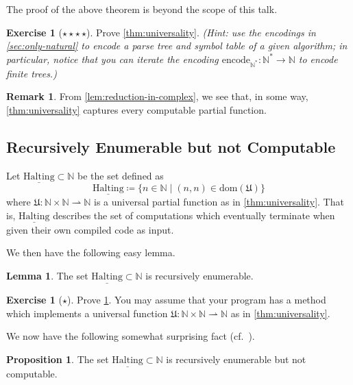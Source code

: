 \documentclass[11pt,a4paper,reqno]{amsart}
\theoremstyle{plain}
\theoremstyle{definition}
\newtheorem{lemma}[theorem]{Lemma}
\newtheorem{proposition}[theorem]{Proposition}
\theoremstyle{definition}
\newtheorem{exercise}[theorem]{Exercise}
\newtheorem{remark}[theorem]{Remark}
\newcommand\exerciseLevelEasy{$\star$}
\newcommand\exerciseLevelVeryHard{$\star${\,}$\star${\,}$\star${\,}$\star$}
\begin{document}
The proof of the above theorem is beyond the scope of this talk.

\begin{exercise}[\exerciseLevelVeryHard]
	Prove \cref{thm:universality}. \textit{(Hint: use the encodings in \cref{sec:only-natural} to encode a parse tree and symbol table of a given algorithm; in particular, notice that you can iterate the encoding $\mathrm{encode}_{\mathbb N^*}\colon \mathbb N^*\to\mathbb N$ to encode finite trees.)}
\end{exercise}

\smallskip

\begin{remark}
	From \cref{lem:reduction-in-complex}, we see that, in some way, \cref{thm:universality} captures every computable partial function.
\end{remark}

\subsection{Recursively Enumerable but not Computable}\label{sec:re-not-comp}

Let $\underline{\mathrm{Halting}}\subset \mathbb N$ be the set defined as
\[
	\underline{\mathrm{Halting}}
	\coloneqq
	\{
	n\in \mathbb N \mid (n,n)\in \mathrm{dom}(\mathfrak U)
	\}
\]
where $\mathfrak U\colon \mathbb N \times \mathbb N\rightharpoonup \mathbb N$ is a universal partial function as in \cref{thm:universality}.
That is, $\underline{\mathrm{Halting}}$ describes the set of computations which eventually terminate when given their own compiled code as input.

We then have the following easy lemma.

\begin{lemma}\label{lem:Halt-is-re}
	The set $\underline{\mathrm{Halting}}\subset \mathbb N$ is recursively enumerable.
\end{lemma}

\begin{exercise}[\exerciseLevelEasy]
	Prove \cref{lem:Halt-is-re}.
	You may assume that your program has a method which implements a universal function $\mathfrak U\colon \mathbb N\times \mathbb N \rightharpoonup \mathbb N$ as in \cref{thm:universality}.
\end{exercise}

We now have the following somewhat surprising fact (cf.~\cite{turing1936}).

\begin{proposition}\label{prop:re-but-not-comp}
	The set $\underline{\mathrm{Halting}}\subset \mathbb N$ is recursively enumerable but not computable.
\end{proposition}
\end{document}

